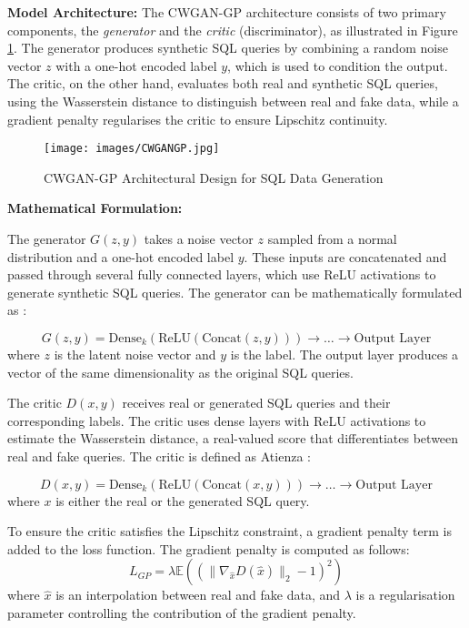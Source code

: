 \documentclass[journal]{IEEEtran}
\begin{document}
\textbf{Model Architecture:} The CWGAN-GP architecture consists of two primary components, the \textit{generator} and the \textit{critic} (discriminator), as illustrated in Figure \ref{fig:cwgan_architecture}. The generator produces synthetic SQL queries by combining a random noise vector \( z \) with a one-hot encoded label \( y \), which is used to condition the output. The critic, on the other hand, evaluates both real and synthetic SQL queries, using the Wasserstein distance to distinguish between real and fake data, while a gradient penalty regularises the critic to ensure Lipschitz continuity.

\begin{figure}[H]
    \centering
    \texttt{[image: images/CWGANGP.jpg]}
    \caption{CWGAN-GP Architectural Design for SQL Data Generation}
    \label{fig:cwgan_architecture}
\end{figure}

\textbf{Mathematical Formulation:}

The generator \( G(z, y) \) takes a noise vector \( z \) sampled from a normal distribution and a one-hot encoded label \( y \). These inputs are concatenated and passed through several fully connected layers, which use ReLU activations to generate synthetic SQL queries. The generator can be mathematically formulated as \cite{atienza2018advanced}:

\[
G(z, y) = \text{Dense}_k(\text{ReLU}(\text{Concat}(z, y))) \to \ldots \to \text{Output Layer}
\]
where \( z \) is the latent noise vector and \( y \) is the label. The output layer produces a vector of the same dimensionality as the original SQL queries.

The critic \( D(x, y) \) receives real or generated SQL queries and their corresponding labels. The critic uses dense layers with ReLU activations to estimate the Wasserstein distance, a real-valued score that differentiates between real and fake queries. The critic is defined as Atienza \cite{atienza2018advanced}:

\[
D(x, y) = \text{Dense}_k(\text{ReLU}(\text{Concat}(x, y))) \to \ldots \to \text{Output Layer}
\]
where \( x \) is either the real or the generated SQL query.

To ensure the critic satisfies the Lipschitz constraint, a gradient penalty term is added to the loss function. The gradient penalty is computed as follows:
\[
L_{GP} = \lambda \mathbb{E} \left( ( \|\nabla_{\hat{x}} D(\hat{x}) \|_2 - 1 )^2 \right)
\]
where \( \hat{x} \) is an interpolation between real and fake data, and \( \lambda \) is a regularisation parameter controlling the contribution of the gradient penalty.
\end{document}
